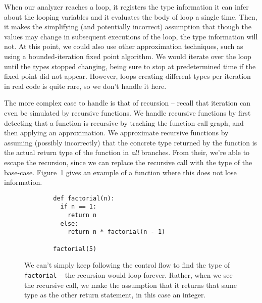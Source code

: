 \documentclass{article}[12pt]
\begin{document}
When our analyzer reaches a loop, it registers the type information it can infer about the looping
variables and it evaluates the body of loop a single time. Then, it makes the simplifying (and
potentially incorrect) assumption that though the values may change in subsequent executions of the
loop, the type information will not. At this point, we could also use other approximation
techniques, such as using a bounded-iteration fixed point algorithm. We would iterate over the loop
until the types stopped changing, being sure to stop at predetermined time if the fixed point
did not appear. However, loops creating different types per iteration in real code is quite rare, so we
don't handle it here.

The more complex case to handle is that of recursion -- recall that iteration can even be simulated
by recursive functions. We handle recursive functions by first detecting that a function is
recursive by tracking the function call graph, and then applying an approximation. We approximate
recursive functions by assuming (possibly incorrectly) that the concrete type returned by the
function is the actual return type of the function in \emph{all} branches. From their, we're able
to escape the recursion, since we can replace the recursive call with the type of the base-case.
Figure~\ref{fig:factorial} gives an example of a function where this does not lose information.

\begin{figure}
    \begin{verbatim}
        def factorial(n):
          if n == 1:
            return n
          else:
            return n * factorial(n - 1)

        factorial(5)
    \end{verbatim}
    \caption{We can't simply keep following the control flow to find the type of \texttt{factorial} -- the
        recursion would loop forever. Rather, when we see the recursive call, we make the assumption
    that it returns that same type as the other return statement, in this case an integer.}
    \label{fig:factorial}
 \end{figure}
\end{document}
